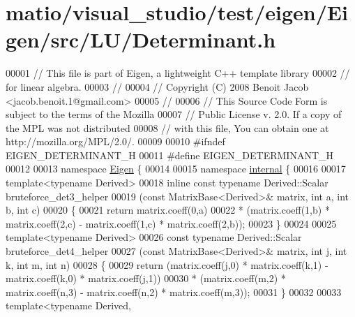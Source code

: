 \hypertarget{matio_2visual__studio_2test_2eigen_2_eigen_2src_2_l_u_2_determinant_8h_source}{}\section{matio/visual\+\_\+studio/test/eigen/\+Eigen/src/\+L\+U/\+Determinant.h}
\label{matio_2visual__studio_2test_2eigen_2_eigen_2src_2_l_u_2_determinant_8h_source}

\begin{DoxyCode}
00001 \textcolor{comment}{// This file is part of Eigen, a lightweight C++ template library}
00002 \textcolor{comment}{// for linear algebra.}
00003 \textcolor{comment}{//}
00004 \textcolor{comment}{// Copyright (C) 2008 Benoit Jacob <jacob.benoit.1@gmail.com>}
00005 \textcolor{comment}{//}
00006 \textcolor{comment}{// This Source Code Form is subject to the terms of the Mozilla}
00007 \textcolor{comment}{// Public License v. 2.0. If a copy of the MPL was not distributed}
00008 \textcolor{comment}{// with this file, You can obtain one at http://mozilla.org/MPL/2.0/.}
00009 
00010 \textcolor{preprocessor}{#ifndef EIGEN\_DETERMINANT\_H}
00011 \textcolor{preprocessor}{#define EIGEN\_DETERMINANT\_H}
00012 
00013 \textcolor{keyword}{namespace }\hyperlink{namespace_eigen}{Eigen} \{ 
00014 
00015 \textcolor{keyword}{namespace }\hyperlink{namespaceinternal}{internal} \{
00016 
00017 \textcolor{keyword}{template}<\textcolor{keyword}{typename} Derived>
00018 \textcolor{keyword}{inline} \textcolor{keyword}{const} \textcolor{keyword}{typename} Derived::Scalar bruteforce\_det3\_helper
00019 (\textcolor{keyword}{const} MatrixBase<Derived>& matrix, \textcolor{keywordtype}{int} a, \textcolor{keywordtype}{int} b, \textcolor{keywordtype}{int} c)
00020 \{
00021   \textcolor{keywordflow}{return} matrix.coeff(0,a)
00022          * (matrix.coeff(1,b) * matrix.coeff(2,c) - matrix.coeff(1,c) * matrix.coeff(2,b));
00023 \}
00024 
00025 \textcolor{keyword}{template}<\textcolor{keyword}{typename} Derived>
00026 \textcolor{keyword}{const} \textcolor{keyword}{typename} Derived::Scalar bruteforce\_det4\_helper
00027 (\textcolor{keyword}{const} MatrixBase<Derived>& matrix, \textcolor{keywordtype}{int} j, \textcolor{keywordtype}{int} k, \textcolor{keywordtype}{int} m, \textcolor{keywordtype}{int} n)
00028 \{
00029   \textcolor{keywordflow}{return} (matrix.coeff(j,0) * matrix.coeff(k,1) - matrix.coeff(k,0) * matrix.coeff(j,1))
00030        * (matrix.coeff(m,2) * matrix.coeff(n,3) - matrix.coeff(n,2) * matrix.coeff(m,3));
00031 \}
00032 
00033 \textcolor{keyword}{template}<\textcolor{keyword}{typename} Derived,

\end{DoxyCode}
